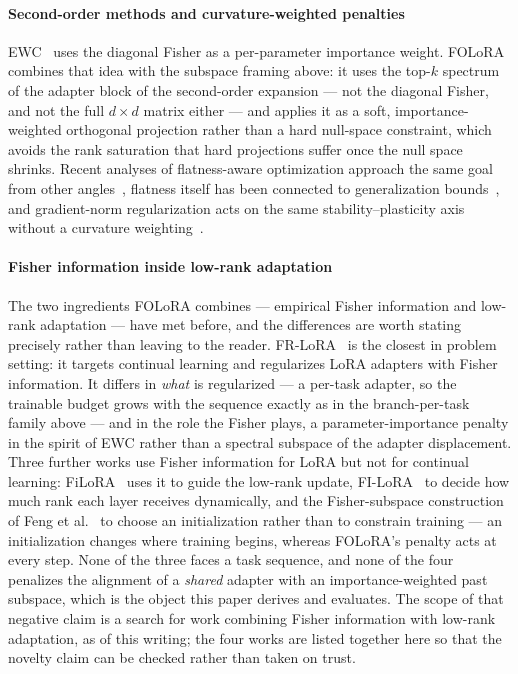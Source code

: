 \paragraph{Second-order methods and curvature-weighted penalties}
EWC~\cite{kirkpatrick2017overcoming} uses the diagonal Fisher as a per-parameter
importance weight. FOLoRA combines that idea with the subspace framing above: it uses the
top-$k$ spectrum of the adapter block of the second-order expansion --- not the diagonal
Fisher, and not the full $d\times d$ matrix either --- and applies it as a soft,
importance-weighted orthogonal projection rather than a hard null-space constraint, which
avoids the rank saturation that hard projections suffer once the null space shrinks.
Recent analyses of flatness-aware optimization approach the same goal from other
angles~\cite{yang2025flatnessogp}, flatness itself has been connected to generalization
bounds~\cite{liu2025flatloss}, and gradient-norm regularization acts on the same
stability--plasticity axis without a curvature weighting~\cite{wang2026gnr}.

\paragraph{Fisher information inside low-rank adaptation}
The two ingredients FOLoRA combines --- empirical Fisher information and low-rank
adaptation --- have met before, and the differences are worth stating precisely rather than
leaving to the reader. FR-LoRA~\cite{adhikari2025frlora} is the closest in problem setting:
it targets continual learning and regularizes LoRA adapters with Fisher information. It
differs in \emph{what} is regularized --- a per-task adapter, so the trainable budget grows
with the sequence exactly as in the branch-per-task family above --- and in the role the
Fisher plays, a parameter-importance penalty in the spirit of EWC rather than a spectral
subspace of the adapter displacement. Three further works use Fisher information for LoRA
but not for continual learning: FiLoRA~\cite{han2026filora} uses it to guide the low-rank
update, FI-LoRA~\cite{zeng2026filora} to decide how much rank each layer receives
dynamically, and the Fisher-subspace construction of Feng et
al.~\cite{feng2026fishersubspace} to choose an initialization rather than to constrain
training --- an initialization changes where training begins, whereas FOLoRA's penalty
acts at every step. None of the three faces a task sequence, and none of the four
penalizes the alignment of a \emph{shared} adapter with an importance-weighted past
subspace, which is the object this paper derives and evaluates. The scope of that negative
claim is a search for work combining Fisher information with low-rank adaptation, as of
this writing; the four works are listed together here so that the novelty claim can be
checked rather than taken on trust.

